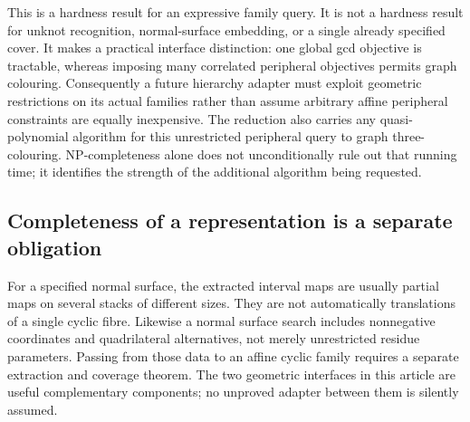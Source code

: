 This is a hardness result for an expressive family query. It is not a
hardness result for unknot recognition, normal-surface embedding, or a
single already specified cover. It makes a practical interface distinction:
one global gcd objective is tractable, whereas imposing many correlated
peripheral objectives permits graph colouring. Consequently a future
hierarchy adapter must exploit geometric restrictions on its actual
families rather than assume arbitrary affine peripheral constraints are
equally inexpensive. The reduction also carries any quasi-polynomial
algorithm for this unrestricted peripheral query to graph three-colouring.
NP-completeness alone does not unconditionally rule out that running time;
it identifies the strength of the additional algorithm being requested.

\subsection{Completeness of a representation is a separate obligation}

For a specified normal surface, the extracted interval maps are usually
partial maps on several stacks of different sizes. They are not
automatically translations of a single cyclic fibre. Likewise a normal
surface search includes nonnegative coordinates and quadrilateral
alternatives, not merely unrestricted residue parameters. Passing from
those data to an affine cyclic family requires a separate extraction
and coverage theorem. The two geometric interfaces in this article are
useful complementary components; no unproved adapter between them is
silently assumed.
